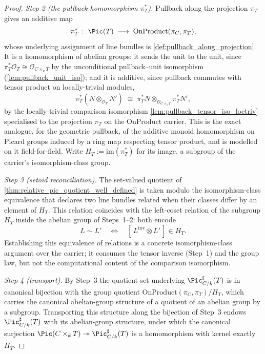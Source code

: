 \begin{proof}
  \emph{Step 2 (the pullback homomorphism \(\pi_T^*\)).} Pullback along the
  projection \(\pi_T\) gives an additive map
  \[
    \pi_T^* \;\colon\; \Pic(T) \;\longrightarrow\; \mathrm{OnProduct}(\pi_C, \pi_T),
  \]
  whose underlying assignment of line bundles is
  \cref{def:pullback_along_projection}. It is a homomorphism of abelian groups:
  it sends the unit to the unit, since
  \(\pi_T^*\mathcal{O}_T \cong \mathcal{O}_{C \times_k T}\) by the unconditional
  pullback--unit isomorphism (\cref{lem:pullback_unit_iso}); and it is additive,
  since pullback commutes with tensor product on locally-trivial modules,
  \[
    \pi_T^*(N \otimes_{\mathcal{O}_T} N') \;\cong\;
      \pi_T^* N \otimes_{\mathcal{O}_{C \times_k T}} \pi_T^* N',
  \]
  by the locally-trivial comparison isomorphism
  \cref{lem:pullback_tensor_iso_loctriv} specialised to the projection
  \(\pi_T\) on the \(\mathrm{OnProduct}\) carrier. This is the exact analogue,
  for the geometric pullback, of the additive monoid homomorphism on Picard
  groups induced by a ring map respecting tensor product, and is modelled on it
  field-for-field. Write \(H_T := \mathrm{im}(\pi_T^*)\) for its image, a
  subgroup of the carrier's isomorphism-class group.

  \emph{Step 3 (setoid reconciliation).} The set-valued quotient of
  \cref{thm:relative_pic_quotient_well_defined} is taken modulo the
  isomorphism-class equivalence that declares two line bundles related when
  their classes differ by an element of \(H_T\). This relation coincides with
  the left-coset relation of the subgroup \(H_T\) inside the abelian group of
  Steps~1--2: both encode
  \[
    L \sim L' \quad\Longleftrightarrow\quad
      [\, L^{\mathrm{inv}} \otimes L' \,] \in H_T .
  \]
  Establishing this equivalence of relations is a concrete isomorphism-class
  argument over the carrier; it consumes the tensor inverse (Step~1) and the
  group law, but not the computational content of the comparison isomorphism.

  \emph{Step 4 (transport).} By Step~3 the quotient set underlying
  \(\Pic^\sharp_{C/k}(T)\) is in canonical bijection with the group quotient
  \(\mathrm{OnProduct}(\pi_C, \pi_T) / H_T\), which carries the canonical
  abelian-group structure of a quotient of an abelian group by a subgroup.
  Transporting this structure along the bijection of Step~3 endows
  \(\Pic^\sharp_{C/k}(T)\) with its abelian-group structure, under which the
  canonical surjection
  \(\Pic(C \times_k T) \twoheadrightarrow \Pic^\sharp_{C/k}(T)\) is a
  homomorphism with kernel exactly \(H_T\).
\end{proof}

